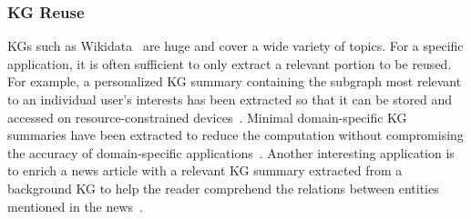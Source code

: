 \subsubsection{KG Reuse}
KGs such as Wikidata~\cite{DBLP:journals/cacm/VrandecicK14} are huge and cover a wide variety of topics. For a specific application, it is often sufficient to only extract a relevant portion to be reused. For example, a personalized KG summary containing the subgraph most relevant to an individual user's interests has been extracted so that it can be stored and accessed on resource-constrained devices~\cite{DBLP:conf/icdm/SafaviBFMMK19,DBLP:conf/esws/VassiliouAPK23}. Minimal domain-specific KG summaries have been extracted to reduce the computation without compromising the accuracy of domain-specific applications~\cite{DBLP:conf/bigdataconf/LalithsenaKS16,DBLP:conf/bigdataconf/LalithsenaPKS17}. Another interesting application is to enrich a news article with a relevant KG summary extracted from a background KG to help the reader comprehend the relations between entities mentioned in the news~\cite{DBLP:conf/cikm/HuangLCKQ19,DBLP:conf/ijcai/LiH0KG20}.